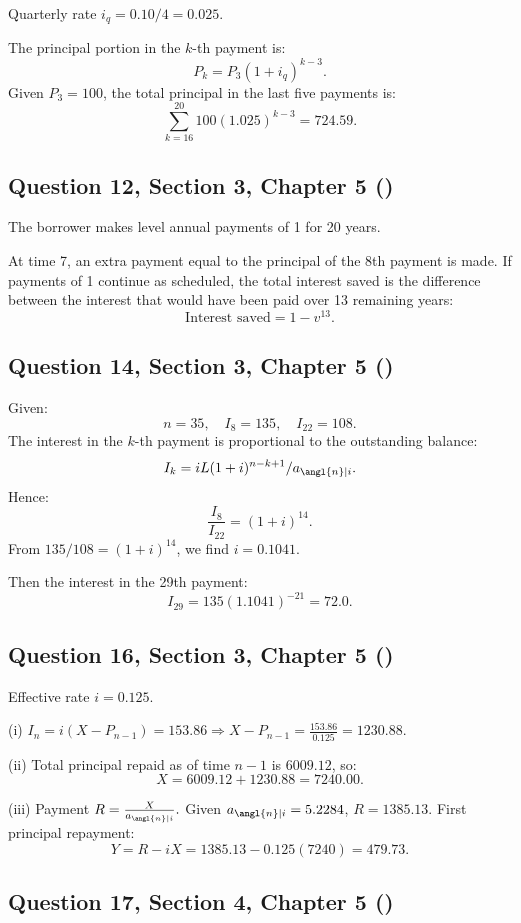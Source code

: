 \documentclass[12pt, a4paper]{article}
\begin{document}
Quarterly rate \( i_q = 0.10 / 4 = 0.025. \)

The principal portion in the \(k\)-th payment is:
\[
P_k = P_3 (1 + i_q)^{k-3}.
\]
Given \( P_3 = 100 \), the total principal in the last five payments is:
\[
\sum_{k=16}^{20} 100(1.025)^{k-3} = 724.59.
\]

\subsection*{Question 12, Section 3, Chapter 5  (\cite{toi3rd})}

The borrower makes level annual payments of 1 for 20 years.

At time 7, an extra payment equal to the principal of the 8th payment is made.  
If payments of 1 continue as scheduled, the total interest saved is the difference between the interest that would have been paid over 13 remaining years:
\[
\text{Interest saved} = 1 - v^{13}.
\]

\subsection*{Question 14, Section 3, Chapter 5  (\cite{toi3rd})}

Given:
\[
n = 35, \quad I_8 = 135, \quad I_{22} = 108.
\]
The interest in the \(k\)-th payment is proportional to the outstanding balance:
\[
I_k = i L (1 + i)^{n - k + 1} / a_{\angl{n}|i}.
\]
Hence:
\[
\frac{I_8}{I_{22}} = (1 + i)^{14}.
\]
From \(135 / 108 = (1 + i)^{14}\), we find \(i = 0.1041.\)

Then the interest in the 29th payment:
\[
I_{29} = 135(1.1041)^{-21} = 72.0.
\]

\subsection*{Question 16, Section 3, Chapter 5  (\cite{toi3rd})}

Effective rate \( i = 0.125 \).

(i) \( I_n = i(X - P_{n-1}) = 153.86 \Rightarrow X - P_{n-1} = \frac{153.86}{0.125} = 1230.88. \)

(ii) Total principal repaid as of time \(n-1\) is \( 6009.12 \), so:
\[
X = 6009.12 + 1230.88 = 7240.00.
\]

(iii) Payment \( R = \frac{X}{a_{\angl{n}|i}}. \)
Given \(a_{\angl{n}|i} = 5.2284\), \(R = 1385.13.\)
First principal repayment:
\[
Y = R - iX = 1385.13 - 0.125(7240) = 479.73.
\]

\subsection*{Question 17, Section 4, Chapter 5  (\cite{toi3rd})}
\end{document}
